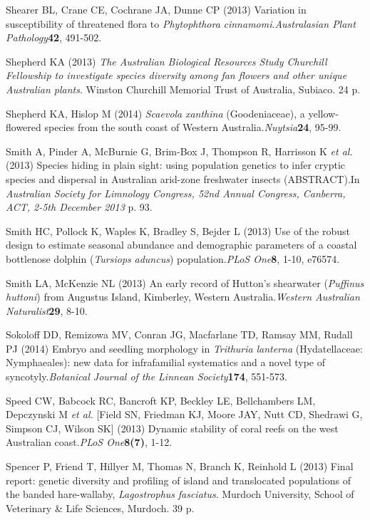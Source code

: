 \documentclass[version=last, paper=a4, DIV=18, usenames, dvipsnames]{scrartcl}
\begin{document}
Shearer BL, Crane CE, Cochrane JA, Dunne CP (2013) Variation in susceptibility of threatened flora to \emph{Phytophthora} \emph{cinnamomi}.\emph{Australasian Plant Pathology}\textbf{42}, 491-502.


Shepherd KA (2013) \emph{The Australian Biological Resources Study Churchill Fellowship to investigate species diversity among fan flowers and other unique Australian plants}. Winston Churchill Memorial Trust of Australia, Subiaco. 24 p.


Shepherd KA, Hislop M (2014) \emph{Scaevola} \emph{xanthina} (Goodeniaceae), a yellow-flowered species from the south coast of Western Australia.\emph{Nuytsia}\textbf{24}, 95-99.


Smith A, Pinder A, McBurnie G, Brim-Box J, Thompson R, Harrisson K \emph{et al.} (2013) Species hiding in plain sight: using population genetics to infer cryptic species and dispersal in Australian arid-zone freshwater insects (ABSTRACT).In \emph{Australian Society for Limnology Congress, 52nd Annual Congress, Canberra, ACT, 2-5th December 2013} p. 93.


Smith HC, Pollock K, Waples K, Bradley S, Bejder L (2013) Use of the robust design to estimate seasonal abundance and demographic parameters of a coastal bottlenose dolphin (\emph{Tursiops} \emph{aduncus}) population.\emph{PLoS One}\textbf{8}, 1-10, e76574.


Smith LA, McKenzie NL (2013) An early record of Hutton's shearwater (\emph{Puffinus} \emph{huttoni}) from Augustus Island, Kimberley, Western Australia.\emph{Western Australian Naturalist}\textbf{29}, 8-10.


Sokoloff DD, Remizowa MV, Conran JG, Macfarlane TD, Ramsay MM, Rudall PJ (2014) Embryo and seedling morphology in \emph{Trithuria} \emph{lanterna} (Hydatellaceae: Nymphaeales): new data for infrafamilial systematics and a novel type of syncotyly.\emph{Botanical Journal of the Linnean Society}\textbf{174}, 551-573.


Speed CW, Babcock RC, Bancroft KP, Beckley LE, Bellchambers LM, Depczynski M \emph{et al.} [Field SN, Friedman KJ, Moore JAY, Nutt CD, Shedrawi G, Simpson CJ, Wilson SK] (2013) Dynamic stability of coral reefs on the west Australian coast.\emph{PLoS One}\textbf{8(7)}, 1-12.


Spencer P, Friend T, Hillyer M, Thomas N, Branch K, Reinhold L (2013) Final report: genetic diversity and profiling of island and translocated populations of the banded hare-wallaby, \emph{Lagostrophus} \emph{fasciatus}. Murdoch University, School of Veterinary \& Life Sciences, Murdoch. 39 p.
\end{document}

